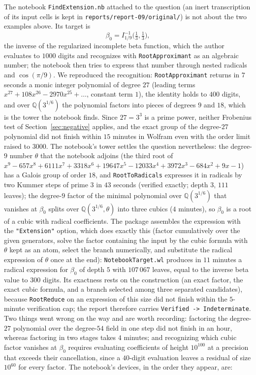 \documentclass[11pt,a4paper]{article}
\theoremstyle{definition}
\theoremstyle{remark}
\newcommand{\Q}{\mathbb{Q}}
\newcommand{\code}[1]{\texttt{#1}}
\begin{document}
The notebook \code{FindExtension.nb} attached to the question (an inert transcription
of its input cells is kept in \code{reports/report-09/original/}) is not about the two
examples above.  Its target is
\[
\beta_0=I^{-1}_{1/9}\bigl(\tfrac13,\tfrac13\bigr),
\]
the inverse of the regularized incomplete beta function, which the author evaluates to
$1000$ digits and recognizes with \code{RootApproximant} as an algebraic number; the
notebook then tries to express that number through nested radicals and $\cos(\pi/9)$.
We reproduced the recognition: \code{RootApproximant} returns in $7$ seconds a monic
integer polynomial of degree $27$ (leading terms $x^{27}+108x^{26}-2970x^{25}+\dots$,
constant term $1$), the identity holds to $400$ digits, and over $\Q(3^{1/6})$ the
polynomial factors into pieces of degrees $9$ and $18$, which is the tower the notebook
finds.  Since $27=3^3$ is a prime power, neither Frobenius test of
Section~\ref{sec:negative} applies, and the exact group of the degree-$27$ polynomial
did not finish within $15$ minutes in Wolfram even with the order limit raised to
$3000$.  The notebook's tower settles the question nevertheless: the degree-$9$ number
$\theta$ that the notebook adjoins (the third root of
$x^9-657x^8+6111x^7+3318x^6+19647x^5-12033x^4+3972x^3-684x^2+9x-1$) has a Galois group
of order $18$, and \code{RootToRadicals} expresses it in radicals by two Kummer steps
of prime $3$ in $43$ seconds (verified exactly; depth $3$, $111$ leaves); the degree-$9$
factor of the minimal polynomial over $\Q(3^{1/6})$ that vanishes at $\beta_0$ splits
over $\Q(3^{1/6},\theta)$ into three cubics ($4$ minutes), so $\beta_0$ is a root of a
cubic with radical coefficients.  The package assembles the expression with the
\code{"Extension"} option, which does exactly this (factor cumulatively over the given
generators, solve the factor containing the input by the cubic formula with $\theta$ kept
as an atom, select the branch numerically, and substitute the radical expression of
$\theta$ once at the end): \code{NotebookTarget.wl} produces in $11$ minutes a radical
expression for $\beta_0$ of depth $5$ with $107\,067$ leaves, equal to the inverse beta
value to $300$ digits.  Its exactness rests on the construction (an exact factor, the
exact cubic formula, and a branch selected among three separated candidates), because
\code{RootReduce} on an expression of this size did not finish within the $5$-minute
verification cap; the report therefore carries \code{Verified -> Indeterminate}.  Two
things went wrong on the way and are worth recording: factoring the degree-$27$
polynomial over the degree-$54$ field in one step did not finish in an hour, whereas
factoring in two stages takes $4$ minutes; and recognizing which cubic factor vanishes at
$\beta_0$ requires evaluating coefficients of height $10^{100}$ at a precision that
exceeds their cancellation, since a $40$-digit evaluation leaves a residual of size
$10^{60}$ for every factor.  The notebook's devices, in the order they appear, are:
\end{document}
